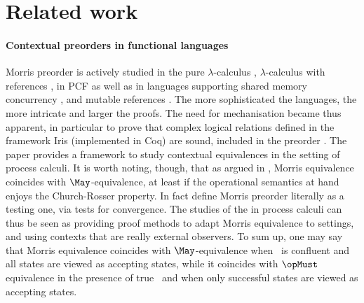 \section{Related work}
\label{sec:bisimulation}
\label{sec:detailed-related-works}


\paragraph{Contextual preorders in functional languages}
Morris preorder is actively studied in
the pure $\lambda$-calculus \cite{DBLP:conf/rta/BreuvartMPR16,DBLP:journals/lmcs/BreuvartMR18,DBLP:journals/lmcs/IntrigilaMP19,DBLP:books/cp/BarendregtM22}, %
$\lambda$-calculus with references \cite{DBLP:conf/icalp/Prebet22,DBLP:conf/fossacs/HirschkoffJP23}, %
in PCF \cite{koutavas13} %
as well as in languages supporting shared memory concurrency \cite{DBLP:conf/popl/TuronTABD13}, and mutable references \cite{DBLP:journals/jfp/DreyerNB12}.
%
The more sophisticated the languages, the more intricate and larger the proofs.
The need for mechanisation became thus apparent, in particular to prove that
complex logical relations defined in the framework Iris
  (implemented in Coq) %
are sound, \ie included in the preorder \cite{DBLP:conf/popl/KrebbersTB17,DBLP:conf/lics/FruminKB18}.
The paper \cite{DBLP:journals/jlap/AubertV22} provides a framework to study
contextual equivalences in the setting of process calculi.
It is worth noting, though, that as argued in
\cite[Section~$3$]{DBLP:journals/lisp/Boudol98},
Morris equivalence coincides with $\May$-equivalence,
at least if the operational semantics at hand enjoys the Church-Rosser
property. In fact \cite{DBLP:conf/caap/BoudolL96} define Morris
preorder literally as a testing one, via tests for convergence.
The studies of the \mustpreorder in process calculi can thus be seen
as providing proof methods to adapt Morris equivalence to
\nondeterministic settings, and using contexts that are really
external observers. To sum up, one may say that
  Morris equivalence coincides with $\May$-equivalence when
  \nondeterminism\ is confluent and all states are viewed as accepting states,
  while it coincides with $\opMust$ equivalence in the presence of true
  \nondeterminism\ and when only successful states are viewed as accepting states.

